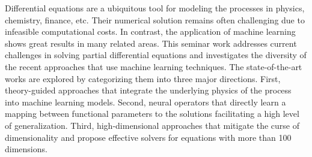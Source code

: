 Differential equations are a ubiquitous tool for modeling the processes in physics, chemistry, finance, etc. Their numerical solution remains often challenging due to infeasible computational costs. In contrast, the application of machine learning shows great results in many related areas. This seminar work addresses current challenges in solving partial differential equations and investigates the diversity of the recent approaches that use machine learning techniques. The state-of-the-art works are explored by categorizing them into three major directions. First, theory-guided approaches that integrate the underlying physics of the process into machine learning models. Second, neural operators that directly learn a mapping between functional parameters to the solutions facilitating a high level of generalization. Third, high-dimensional approaches that mitigate the curse of dimensionality and propose effective solvers for equations with more than 100 dimensions.

